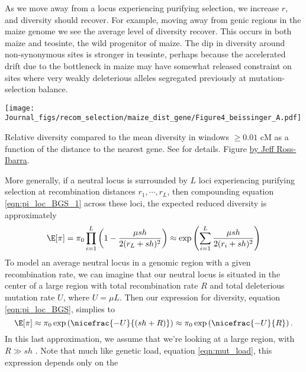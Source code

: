 As we move away from a locus experiencing purifying selection, 
we increase $r$, and diversity should recover. For example, moving away
from genic regions in the maize genome we see the average level of
diversity recover. This occurs in both maize and teosinte, the wild
progenitor of maize. The dip in diversity around non-synonymous sites is stronger in teosinte, perhaps because the accelerated drift due to the
bottleneck in maize
may have somewhat released constraint on sites where very weakly deleterious
alleles segregated previously at mutation-selection balance. 
\begin{marginfigure}
\begin{center}
\texttt{[image: Journal\_figs/recom\_selection/maize\_dist\_gene/Figure4\_beissinger\_A.pdf]}
\end{center}
\caption{Relative diversity compared to the mean diversity in windows
  $\ge 0.01$ cM as a function of the distance to the nearest gene.
  See \citep{beissinger2016recent} for details. Figure \PLOSccBY
   \href{https://github.com/RILAB/beissinger_ms}{by Jeff Ross-Ibarra}.} \label{fig:BGS_maize}
\end{marginfigure}
More generally, if a neutral locus is surrounded by $L$ loci
experiencing purifying selection at recombination distances
$r_1,\cdots,r_L$, then compounding equation \eqref{eqn:pi_loc_BGS_1}
across these loci, the expected reduced diversity is approximately
\begin{equation}
\E[\pi] = \pi_0  \prod_{i=1}^L \left(1-\frac{\mu sh}{2(r_L+sh)^2}
\right) \approx \exp \left( \sum_{i=1}^L \frac{\mu sh}{2(r_i+sh)^2} \right) \label{eqn:pi_loc_BGS}
\end{equation}
To model an average neutral locus in a genomic region with a given recombination rate, we can imagine that our neutral locus is situated in the center of a large region with
total recombination rate $R$ and total deleterious mutation rate $U$,
where $U = \mu L$. Then our expression for diversity, equation \eqref{eqn:pi_loc_BGS}, simplies to 
\begin{equation}
\E[\pi] \approx \pi_0 \exp \left( \nicefrac{-U}{(sh+R)} \right)
\approx \pi_0 \exp \left( \nicefrac{-U}{R} \right). \label{eqn:GW_BGS_1}
\end{equation}
In this last approximation, we assume that we're looking at a
large region, with $R \gg sh$ . Note that much like genetic load,
equation \eqref{eqn:mut_load}, this expression depends only on the
